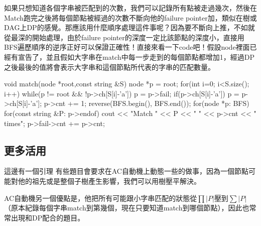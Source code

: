 如果只想知道各個字串被匹配到的次數，我們可以記錄所有點被走過幾次，然後在Match跑完之後將每個節點被經過的次數不斷向他的failure pointer加，類似在樹或DAG上DP的感覺。那應該用什麼順序處理這件事呢？因為要不斷向上推，不如就從最深的開始處理，由於failure pointer的深度一定比該節點的深度小，直接用BFS遍歷順序的逆序正好可以保證正確性！直接來看一下code吧！假設node裡面已經有宣告了，並且假如大字串在match中每一步走到的每個節點都增加1，經過DP之後最後的值將會表示大字串和這個節點所代表的字串的匹配數量。
\begin{C++}
void match(node *root,const string &S){
    node *p = root;
    for(int i=0; i<S.size(); i++) {
    		while(p != root && !p->ch[S[i]-'a']) p = p->fail;
    		if(p->ch[S[i]-'a']) p = p->ch[S[i]-'a'];
    		p->cnt += 1;
    }
    reverse(BFS.begin(), BFS.end());
    for(node *p: BFS) {
		for(const string &P: p->endof) {
    			cout << "Match " << P << " " << p->cnt << " times\n";
		}
		p->fail->cnt += p->cnt;
    }
}
\end{C++}
\subsection{更多活用}
這邊有一個引理
有些題目會要求在AC自動機上動態一些的做事，因為一個節點可能對他的祖先或是整個子樹產生影響，我們可以用樹壓平解決。

AC自動機另一個優點是，他把所有可能跟小字串匹配的狀態從$\prod |P|$壓到$\sum |P|$（原本紀錄每個字串match到第幾個，現在只要知道match到哪個節點），因此也常常出現和DP配合的題目。



